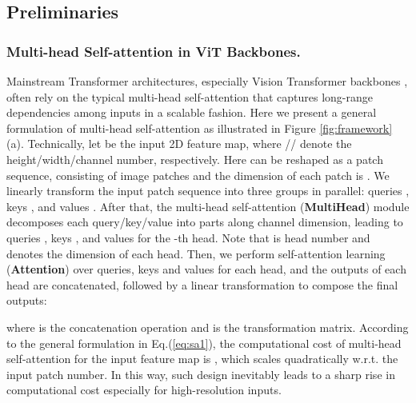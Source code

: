 \documentclass[runningheads]{llncs}
\begin{document}
\begin{figure*}[!tb]
\vspace{-0.1in}
\vspace{-0.2in}
\caption{\small The detailed architectures of (a) basic self-attention block in ViT Backbones, (b) self-attention block with down-sampling operation (\emph{i.e.}, DS) that reduces the spatial scale of both height and width by half, and (c) our Wavelets block that capitalizes on wavelet transforms to enable lossless down-sampling.}
\label{fig:framework}
\vspace{-0.2in}
\end{figure*}

\subsection{Preliminaries}

\subsubsection{Multi-head Self-attention in ViT Backbones.}
Mainstream Transformer architectures, especially Vision Transformer backbones \cite{dosovitskiy2020image}, often rely on the typical multi-head self-attention that captures long-range dependencies among inputs in a scalable fashion. Here we present a general formulation of multi-head self-attention as illustrated in Figure \ref{fig:framework} (a). Technically, let  be the input 2D feature map, where // denote the height/width/channel number, respectively. Here  can be reshaped as a patch sequence, consisting of  image patches and the dimension of each patch is . We linearly transform the input patch sequence  into three groups in parallel: queries , keys , and values . After that, the multi-head self-attention ({\bf{MultiHead}}) module \cite{vaswani2017attention} decomposes each query/key/value into  parts along channel dimension, leading to queries , keys , and values  for the -th head. Note that  is head number and  denotes the dimension of each head. Then, we perform self-attention learning ({\bf{Attention}}) over queries, keys and values for each head, and the outputs of each head are concatenated, followed by a linear transformation to compose the final outputs:

where  is the concatenation operation and  is the transformation matrix.
According to the general formulation in Eq.(\ref{eq:sa1}), the computational cost of multi-head self-attention for the input feature map  is , which scales quadratically w.r.t. the input patch number. In this way, such design inevitably leads to a sharp rise in computational cost especially for high-resolution inputs.
\end{document}
